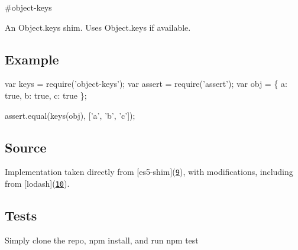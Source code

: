\#object-\/keys \textsuperscript{\href{https://npmjs.org/package/object-keys}{\tt }}

\href{https://travis-ci.org/ljharb/object-keys}{\tt } \href{https://david-dm.org/ljharb/object-keys}{\tt }

\href{https://ci.testling.com/ljharb/object-keys}{\tt }

An Object.\+keys shim. Uses Object.\+keys if available.

\subsection*{Example}


\begin{DoxyCode}
var keys = require('object-keys');
var assert = require('assert');
var obj = \{
    a: true,
    b: true,
    c: true
\};

assert.equal(keys(obj), ['a', 'b', 'c']);
\end{DoxyCode}


\subsection*{Source}

Implementation taken directly from \mbox{[}es5-\/shim\mbox{]}(\href{https://github.com/kriskowal/es5-shim/blob/master/es5-shim.js#L542-589}{\tt 9}), with modifications, including from \mbox{[}lodash\mbox{]}(\href{https://github.com/bestiejs/lodash}{\tt 10}).

\subsection*{Tests}

Simply clone the repo, {\ttfamily npm install}, and run {\ttfamily npm test} 